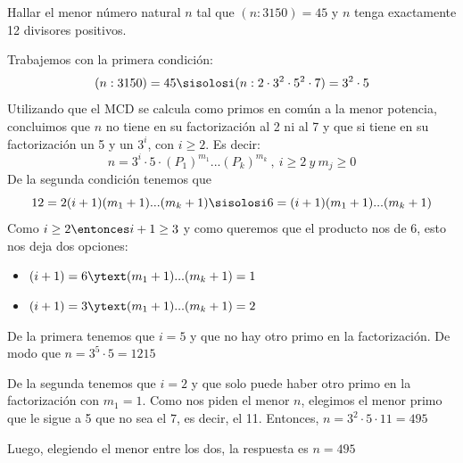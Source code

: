 \begin{enunciado}{\ejercicio}
  Hallar el menor número natural $n$ tal que $(n : 3150) = 45$
  y $n$ tenga exactamente 12 divisores positivos.
\end{enunciado}

Trabajemos con la primera condición:
$$
  (n:3150)=45
  \sisolosi
  (n:2\cdot3^{2}\cdot5^{2}\cdot7)=3^{2}\cdot5
$$
Utilizando que el MCD se calcula como primos en común a la menor potencia, concluimos que $n$ no tiene en su factorización al 2 ni al 7
y que si tiene en su factorización un 5 y un $3^{i}$, con $i \geq 2$. Es decir:
$$
  n = 3^i \cdot 5 \cdot (P_1)^{m_1}...(P_k)^{m_k} ~,~ i \geq 2 ~ y ~  m_j \geq 0
$$
De la segunda condición tenemos que
$$
  12 =2(i+1)(m_1+1)...(m_k+1)
  \sisolosi
  6=(i+1)(m_1+1)...(m_k+1)
$$
Como  $i \geq 2 \entonces i+1 \geq 3$ y como queremos que el producto nos de 6, esto nos deja dos opciones:
\begin{itemize}
  \item $(i+1)= 6 \ytext (m_1+1)...(m_k+1)= 1$
  \item $(i+1)=3 \ytext (m_1+1)...(m_k+1)=2$
\end{itemize}

De la primera tenemos que $i=5$ y que no hay otro primo en la factorización. De modo que $n=3^5 \cdot 5 = 1215$

De la segunda tenemos que $i=2$ y que solo puede haber otro primo en la factorización con $m_1=1$.
Como nos piden el menor $n$, elegimos el menor primo que le sigue a 5 que no sea el 7, es decir, el 11. Entonces, $n = 3^2\cdot5\cdot11=495$

Luego, elegiendo el menor entre los dos, la respuesta es $\boxed{n=495}$

\begin{aportes}
  \item {}
\end{aportes}
